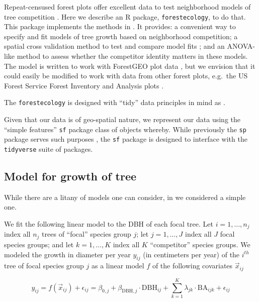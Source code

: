 \documentclass[12pt]{article}
\begin{document}
Repeat-censused forest plots offer excellent data to test neighborhood
models of tree competition \citet{allen_permutation_2020}
\citet{canham_neighborhood_2006} \citet{uriarte_spatially_2004}. Here we
describe an R package, \texttt{forestecology}, to do that. This package
implements the methods in \citet{allen_permutation_2020}. It provides: a
convenient way to specify and fit models of tree growth based on
neighborhood competition; a spatial cross validation method to test and
compare model fits \citet{roberts_cross-validation_2017}; and an
ANOVA-like method to assess whether the competitor identity matters in
these models. The model is written to work with ForestGEO plot data
\citet{andersonteixeira_ctfs-forestgeo_2015}, but we envision that it
could easily be modified to work with data from other forest plots,
e.g.~the US Forest Service Forest Inventory and Analysis plots
\citet{smith_forest_2002}.

The \texttt{forestecology} is designed with ``tidy'' data principles in
mind as \citet{wickham_welcome_2019}.

Given that our data is of geo-spatial nature, we represent our data
using the ``simple features'' \texttt{sf} package class of objects
\citet{pebesma_simple_2018} whereby. While previously the \texttt{sp}
package serves such purposes \citet{pebesma_sp_2005}, the \texttt{sf}
package is designed to interface with the \texttt{tidyverse} suite of
packages.

\hypertarget{competition-model}{%
\subsection{Model for growth of tree}\label{competition-model}}

While there are a litany of models one can consider, in
\citet{allen_permutation_2020} we considered a simple one.

We fit the following linear model to the DBH of each focal tree. Let
\(i = 1, \ldots, n_j\) index all \(n_j\) trees of ``focal'' species
group \(j\); let \(j = 1, \ldots, J\) index all \(J\) focal species
groups; and let \(k = 1, \ldots, K\) index all \(K\) ``competitor''
species groups. We modeled the growth in diameter per year \(y_{ij}\)
(in centimeters per year) of the \(i^{th}\) tree of focal species group
\(j\) as a linear model \(f\) of the following covariates
\(\vec{x}_{ij}\)

\[
\newcommand{\dbh}{\text{DBH}}
\newcommand{\biomass}{\text{biomass}}
\newcommand{\BA}{\text{BA}}
y_{ij} = f(\vec{x}_{ij}) + \epsilon_{ij} = \beta_{0,j} + \beta_{\dbh,j} \cdot \dbh_{ij} + \sum_{k=1}^{K} \lambda_{jk} \cdot \BA_{ijk} + \epsilon_{ij}
\]
\end{document}
